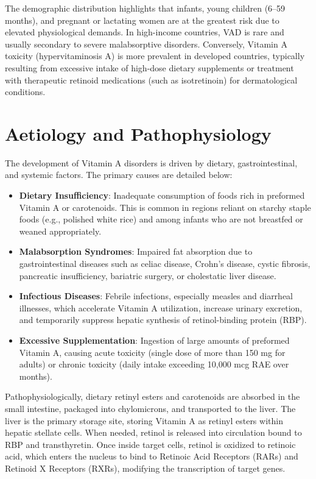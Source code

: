 The demographic distribution highlights that infants, young children (6--59 months), and pregnant or lactating women are at the greatest risk due to elevated physiological demands. In high-income countries, VAD is rare and usually secondary to severe malabsorptive disorders. Conversely, Vitamin A toxicity (hypervitaminosis A) is more prevalent in developed countries, typically resulting from excessive intake of high-dose dietary supplements or treatment with therapeutic retinoid medications (such as isotretinoin) for dermatological conditions.

\section*{Aetiology and Pathophysiology}
The development of Vitamin A disorders is driven by dietary, gastrointestinal, and systemic factors. The primary causes are detailed below:
\begin{itemize}
    \item \textbf{Dietary Insufficiency}: Inadequate consumption of foods rich in preformed Vitamin A or carotenoids. This is common in regions reliant on starchy staple foods (e.g., polished white rice) and among infants who are not breastfed or weaned appropriately.
    \item \textbf{Malabsorption Syndromes}: Impaired fat absorption due to gastrointestinal diseases such as celiac disease, Crohn's disease, cystic fibrosis, pancreatic insufficiency, bariatric surgery, or cholestatic liver disease.
    \item \textbf{Infectious Diseases}: Febrile infections, especially measles and diarrheal illnesses, which accelerate Vitamin A utilization, increase urinary excretion, and temporarily suppress hepatic synthesis of retinol-binding protein (RBP).
    \item \textbf{Excessive Supplementation}: Ingestion of large amounts of preformed Vitamin A, causing acute toxicity (single dose of more than 150 mg for adults) or chronic toxicity (daily intake exceeding 10,000 mcg RAE over months).
\end{itemize}

Pathophysiologically, dietary retinyl esters and carotenoids are absorbed in the small intestine, packaged into chylomicrons, and transported to the liver. The liver is the primary storage site, storing Vitamin A as retinyl esters within hepatic stellate cells. When needed, retinol is released into circulation bound to RBP and transthyretin. Once inside target cells, retinol is oxidized to retinoic acid, which enters the nucleus to bind to Retinoic Acid Receptors (RARs) and Retinoid X Receptors (RXRs), modifying the transcription of target genes.

